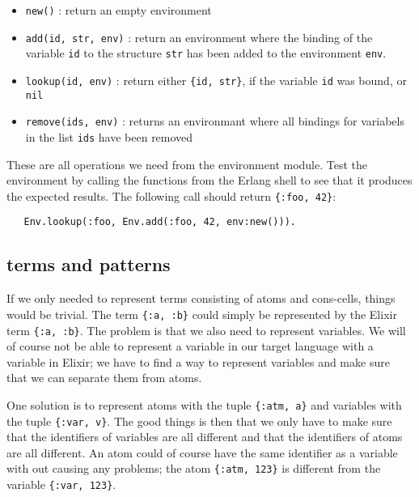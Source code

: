 \documentclass[a4paper,11pt]{article}
\begin{document}
\begin{itemize}
\item {\tt new()} : return an empty environment

\item {\tt add(id, str, env)} : return an environment where the
  binding of the variable {\tt id} to the structure {\tt str} has been
  added to the environment {\tt env}.

\item {\tt lookup(id, env)} : return either {\tt \{id, str\}}, if the
  variable {\tt id} was bound, or {\tt nil}

\item {\tt remove(ids, env)} : returns an environmant where all
  bindings for variabels in the list {\tt ids} have been removed

\end{itemize}

These are all operations we need from the environment module. Test the
environment by calling the functions from the Erlang shell to see that
it produces the expected results. The following
call should return {\tt \{:foo,  42\}}:

\begin{verbatim}
   Env.lookup(:foo, Env.add(:foo, 42, env:new())).
\end{verbatim}

\subsection{terms and patterns}

If we only needed to represent terms consisting of atoms and
cons-cells, things would be trivial. The term {\tt \{:a, :b\}} could
simply be represented by the Elixir term {\tt \{:a, :b\}}. The problem
is that we also need to represent variables. We will of
course not be able to represent a variable in our target language with
a variable in Elixir; we have to find a way to represent variables and
make sure that we can separate them from atoms.

One solution is to represent atoms with the tuple {\tt \{:atm, a\}} and
variables with the tuple {\tt \{:var, v\}}. The good things is then
that we only have to make sure that the identifiers of variables are
all different and that the identifiers of atoms are all different. An
atom could of course have the same identifier as a variable with out
causing any problems; the atom {\tt \{:atm, 123\}} is different from
the variable {\tt \{:var, 123\}}.
\end{document}
